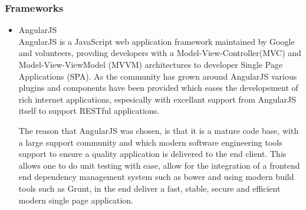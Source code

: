 \documentclass[a4paper,10pt]{article}
\begin{document}
\subsubsection{Frameworks}
	\begin{itemize}
	\item AngularJS\\
		AngularJS is a JavaScript web application framework maintained by Google and volunteers, provding developers with a Model-View-Controller(MVC) and Model-View-ViewModel (MVVM) architectures to developer Single Page Applications (SPA). As the community has grown around AngularJS various plugins and components have been provided which eases the developement of rich internet applications, espesically with excellant support from AngularJS itself to support RESTful applications.

		The reason that AngularJS was chosen, is that it is a mature code base, with a large support community and which modern software engineering tools support to ensure a quality application is delivered to the end client. This allows one to do unit testing with ease, allow for the integration of a frontend end dependency management system such as bower and using modern build tools such as Grunt, in the end deliver a fast, stable, secure and efficient modern single page application.
	\end{itemize}
\end{document}
